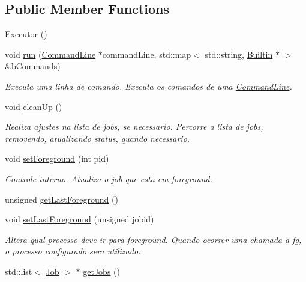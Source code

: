 \subsection*{Public Member Functions}
\begin{DoxyCompactItemize}
\item 
\hyperlink{classExecutor_af10e2be4ceafc43c65cb888d14a519de}{Executor} ()
\item 
void \hyperlink{classExecutor_ab0fe153cc70998a0b89837fab30c50c7}{run} (\hyperlink{classCommandLine}{CommandLine} $\ast$commandLine, std::map$<$ std::string, \hyperlink{classBuiltin}{Builtin} $\ast$ $>$ \&bCommands)
\begin{DoxyCompactList}\small\item\em Executa uma linha de comando. Executa os comandos de uma \hyperlink{classCommandLine}{CommandLine}. \item\end{DoxyCompactList}\item 
void \hyperlink{classExecutor_a62f3a102e3cd4fcfd66697e84bd6eb7a}{cleanUp} ()
\begin{DoxyCompactList}\small\item\em Realiza ajustes na lista de jobs, se necessario. Percorre a lista de jobs, removendo, atualizando status, quando necessario. \item\end{DoxyCompactList}\item 
void \hyperlink{classExecutor_aba6c22f3bd51d26d2fb403664294ada8}{setForeground} (int pid)
\begin{DoxyCompactList}\small\item\em Controle interno. Atualiza o job que esta em foreground. \item\end{DoxyCompactList}\item 
unsigned \hyperlink{classExecutor_a5f46c3263b42d9cbf043cc26351f75e0}{getLastForeground} ()
\item 
void \hyperlink{classExecutor_a29e399610629607f1f00cbb8f33eb3b3}{setLastForeground} (unsigned jobid)
\begin{DoxyCompactList}\small\item\em Altera qual processo deve ir para foreground. Quando ocorrer uma chamada a fg, o processo configurado sera utilizado. \item\end{DoxyCompactList}\item 
std::list$<$ \hyperlink{structExecutor_1_1Job}{Job} $>$ $\ast$ \hyperlink{classExecutor_a5514d88e0b4d4a04f8a3065a497af00e}{getJobs} ()
\end{DoxyCompactItemize}


